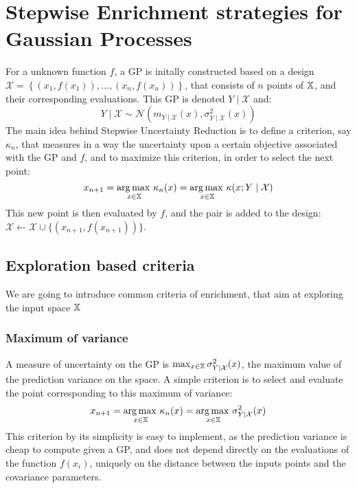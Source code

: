 \documentclass[../../Main_ManuscritThese.tex]{subfiles}
\begin{document}
\section{Stepwise Enrichment strategies for Gaussian Processes}
\label{sec:enrichment_strategies}
For a unknown function $f$, a GP is initally constructed based on a design $\mathcal{X} = \left\{\left(x_1,f(x_1)\right), \dots, \left(x_n, f(x_n)\right)\right\}$, that consists of $n$ points of $\mathbb{X}$, and their corresponding evaluations. This GP is denoted $Y \mid \mathcal{X}$ and:
\begin{equation}
  \label{eq:YgivenXGP}
  Y\mid \mathcal{X} \sim \mathcal{N}(m_{Y\mid\mathcal{X}}(x),\sigma^2_{Y\mid\mathcal{X}}(x))
\end{equation}
The main idea behind Stepwise Uncertainty Reduction is to define a criterion, say $\kappa_n$, that measures in a way the uncertainty upon a certain objective associated with the GP and $f$, and to maximize this criterion, in order to select the next point:
\begin{equation}
  x_{n+1} = \operatorname*{arg\,max \,}_{x\in\mathbb{X}} \kappa_n(x) = \operatorname*{arg\,max \,}_{x\in\mathbb{X}} \kappa(x; Y \mid \mathcal{X})
\end{equation}
This new point is then evaluated by $f$, and the pair is added to the design: $\mathcal{X} \gets \mathcal{X} \cup \{(x_{n+1}, f(x_{n+1}))\}$.
\subsection{Exploration based criteria}
\label{sec:exploration_criteria}
We are going to introduce common criteria of enrichment, that aim at exploring the input space $\mathbb{X}$

\subsubsection{Maximum of variance}
A measure of uncertainty on the GP is $\max_{x\in\mathbb{X}} \sigma_{Y \mid \mathcal{X}}^2(x)$, the maximum value of the prediction variance on the space.
A simple criterion is to select and evaluate the point corresponding to this maximum of variance:
\begin{equation}
  x_{n+1} = \operatorname*{arg\,max \,}_{x\in \mathbb{X}} \kappa_n(x) = \operatorname*{arg\,max \,}_{x \in \mathbb{X}} \sigma^2_{Y \mid \mathcal{X}}(x)
\end{equation}
This criterion by its simplicity is easy to implement, as the prediction variance is cheap to compute given a GP, and does not depend directly on the evaluations of the function $f(x_i)$, uniquely on the distance between the inputs points and the covariance parameters.
\end{document}
